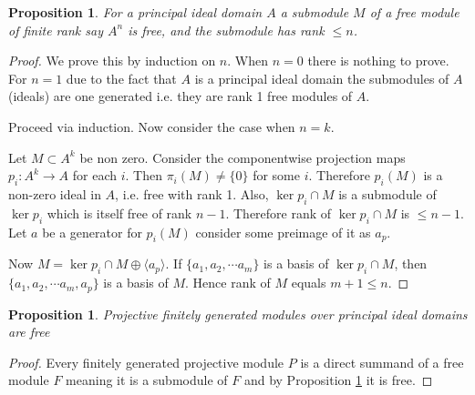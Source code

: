 \documentclass[12pt]{report}
\numberwithin{equation}{section}
\newcounter{dummy} \numberwithin{dummy}{section}
\newtheorem{lemma}[dummy]{Lemma}
\newtheorem{proposition}[dummy]{Proposition}
\begin{document}
	\begin{proposition}\label{submodoffreemodisfreepid}
		For a principal ideal domain $A$ a submodule $M$ of a free module of finite rank say $A^n $ is free, and the submodule has rank $\leq n$.
	\end{proposition}
	\begin{proof}
		We prove this by induction on $n$. When $n=0$ there is nothing to prove. For $n=1$ due to the fact that $A$ is a principal ideal domain the submodules of $A$ (ideals) are one generated i.e. they are rank 1 free modules of $A$.
		
		Proceed via induction. Now consider the case when $n=k$. 
		
		Let $M \subset A^k$ be non zero. Consider the componentwise projection maps $p_i: A^{k} \to A$ for each $i$. Then $\pi_i(M) \neq \{0\}$ for some $i$. Therefore $p_i(M)$ is a non-zero ideal in $A$, i.e. free with rank 1. Also, $\ker p_i \cap M$ is a submodule of $\ker p_i$ which is itself free of rank $n-1$. Therefore rank of $\ker p_i \cap M$ is $\leq n - 1$. Let $a$ be a generator for $p_i(M)$ consider some preimage of it as $a_p$.
		
		Now $M = \ker p_i \cap M \oplus \langle a_p \rangle$. If $\{a_1, a_2, \cdots a_m\}$ is a basis of $\ker p_i \cap M$, then $\{a_1, a_2, \cdots a_m, a_p \}$ is a basis of $M$. Hence rank of $M$ equals $m + 1 \leq n$. 
		
	\end{proof}
	
	\begin{proposition}\label{projfgpidfree}
		Projective finitely generated modules over principal ideal domains are free
	\end{proposition}
	\begin{proof}
		Every finitely generated projective module $P$ is a direct summand of a free module $F$ meaning it is a submodule of $F$ and by Proposition \ref{submodoffreemodisfreepid} it is free.
	\end{proof}
	
\end{document}
